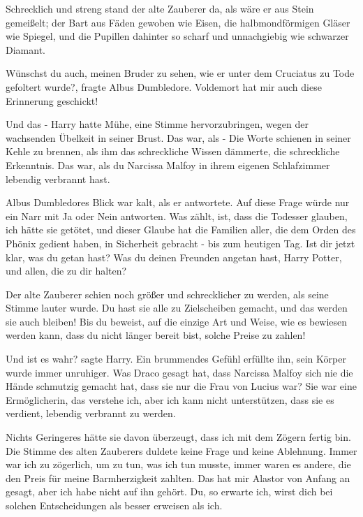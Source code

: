 Schrecklich und streng stand der alte Zauberer da, als wäre er aus Stein
gemeißelt; der Bart aus Fäden gewoben wie Eisen, die halbmondförmigen Gläser wie
Spiegel, und die Pupillen dahinter so scharf und unnachgiebig wie schwarzer
Diamant.

\glqq Wünschst du auch, meinen Bruder zu sehen, wie er unter dem Cruciatus zu
Tode gefoltert wurde?\grqq{}, fragte Albus Dumbledore. \glqq Voldemort hat mir
auch diese Erinnerung geschickt!\grqq{}

\glqq Und das -\grqq{} Harry hatte Mühe, eine Stimme hervorzubringen, wegen der
wachsenden Übelkeit in seiner Brust. \glqq Das war, als -\grqq{} Die Worte
schienen in seiner Kehle zu brennen, als ihm das schreckliche Wissen dämmerte,
die schreckliche Erkenntnis. \glqq Das war, als du Narcissa Malfoy in ihrem
eigenen Schlafzimmer lebendig verbrannt hast.\grqq{}

Albus Dumbledores Blick war kalt, als er antwortete. \glqq Auf diese Frage würde
nur ein Narr mit Ja oder Nein antworten. Was zählt, ist, dass die Todesser
glauben, ich hätte sie getötet, und dieser Glaube hat die Familien aller, die
dem Orden des Phönix gedient haben, in Sicherheit gebracht - bis zum heutigen
Tag. Ist dir jetzt klar, was du getan hast? Was du deinen Freunden angetan hast,
Harry Potter, und allen, die zu dir halten?\grqq{}

Der alte Zauberer schien noch größer und schrecklicher zu werden, als seine
Stimme lauter wurde. \glqq Du hast sie alle zu Zielscheiben gemacht, und das
werden sie auch bleiben! Bis du beweist, auf die einzige Art und Weise, wie es
bewiesen werden kann, dass du nicht länger bereit bist, solche Preise zu
zahlen!\grqq{}

\glqq Und ist es wahr?\grqq{} sagte Harry. Ein brummendes Gefühl erfüllte ihn,
sein Körper wurde immer unruhiger. \glqq Was Draco gesagt hat, dass Narcissa
Malfoy sich nie die Hände schmutzig gemacht hat, dass sie nur die Frau von
Lucius war? Sie war eine Ermöglicherin, das verstehe ich, aber ich kann nicht
unterstützen, dass sie es verdient, lebendig verbrannt zu werden.\grqq{}

\glqq Nichts Geringeres hätte sie davon überzeugt, dass ich mit dem Zögern
fertig bin.\grqq{} Die Stimme des alten Zauberers duldete keine Frage und keine
Ablehnung. \glqq Immer war ich zu zögerlich, um zu tun, was ich tun musste,
immer waren es andere, die den Preis für meine Barmherzigkeit zahlten. Das hat
mir Alastor von Anfang an gesagt, aber ich habe nicht auf ihn gehört. Du, so
erwarte ich, wirst dich bei solchen Entscheidungen als besser erweisen als
ich.\grqq{}

